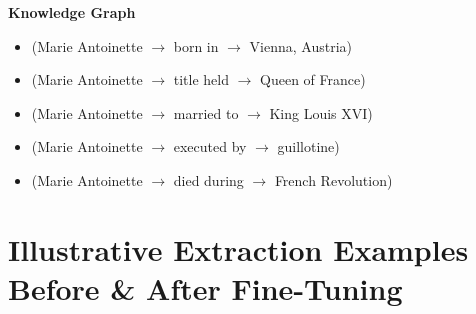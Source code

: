 \documentclass[11pt]{article}
\begin{document}
\textbf{Knowledge Graph}
\begin{itemize}[leftmargin=1em]
\item (Marie Antoinette $\rightarrow$ born in $\rightarrow$ Vienna, Austria)
\item (Marie Antoinette $\rightarrow$ title held $\rightarrow$ Queen of France)
\item (Marie Antoinette $\rightarrow$ married to $\rightarrow$ King Louis XVI)
\item (Marie Antoinette $\rightarrow$ executed by $\rightarrow$ guillotine)
\item (Marie Antoinette $\rightarrow$ died during $\rightarrow$ French Revolution)
\end{itemize}



\section{Illustrative Extraction Examples Before \& After Fine-Tuning} \label{appendix:examples_training}
\end{document}
